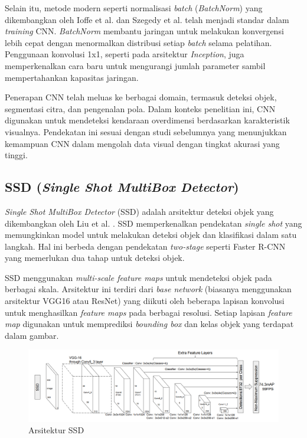 Selain itu, metode modern seperti normalisasi \emph{batch} (\emph{BatchNorm}) yang dikembangkan oleh Ioffe et al. \parencite*{ioffe2015} dan Szegedy et al. \parencite*{szegedy2015} telah menjadi standar dalam \emph{training} CNN. \emph{BatchNorm} membantu jaringan untuk melakukan konvergensi lebih cepat dengan menormalkan distribusi setiap \emph{batch} selama pelatihan. Penggunaan konvolusi 1x1, seperti pada arsitektur \emph{Inception}, juga memperkenalkan cara baru untuk mengurangi jumlah parameter sambil mempertahankan kapasitas jaringan.
 
Penerapan CNN telah meluas ke berbagai domain, termasuk deteksi objek, segmentasi citra, dan pengenalan pola. Dalam konteks penelitian ini, CNN digunakan untuk mendeteksi kendaraan overdimensi berdasarkan karakteristik visualnya. Pendekatan ini sesuai dengan studi sebelumnya yang menunjukkan kemampuan CNN dalam mengolah data visual dengan tingkat akurasi yang tinggi.
\subsection{SSD (\emph{Single Shot MultiBox Detector})}

\emph{Single Shot MultiBox Detector} (SSD) adalah arsitektur deteksi objek yang dikembangkan oleh Liu et al. \parencite*{liu2016}. SSD memperkenalkan pendekatan \emph{single shot} yang memungkinkan model untuk melakukan deteksi objek dan klasifikasi dalam satu langkah. Hal ini berbeda dengan pendekatan \emph{two-stage} seperti Faster R-CNN yang memerlukan dua tahap untuk deteksi objek.

SSD menggunakan \emph{multi-scale feature maps} untuk mendeteksi objek pada berbagai skala. Arsitektur ini terdiri dari \emph{base network} (biasanya menggunakan arsitektur VGG16 atau ResNet) yang diikuti oleh beberapa lapisan konvolusi untuk menghasilkan \emph{feature maps} pada berbagai resolusi. Setiap lapisan \emph{feature map} digunakan untuk memprediksi \emph{bounding box} dan kelas objek yang terdapat dalam gambar.

\begin{figure}[H]
  \centering
  \includegraphics[scale=0.36]{gambar/bab2-arsitektur-ssd.png}
  \caption{Arsitektur SSD}
  \label{fig:arsitektur_ssd}
\end{figure}

